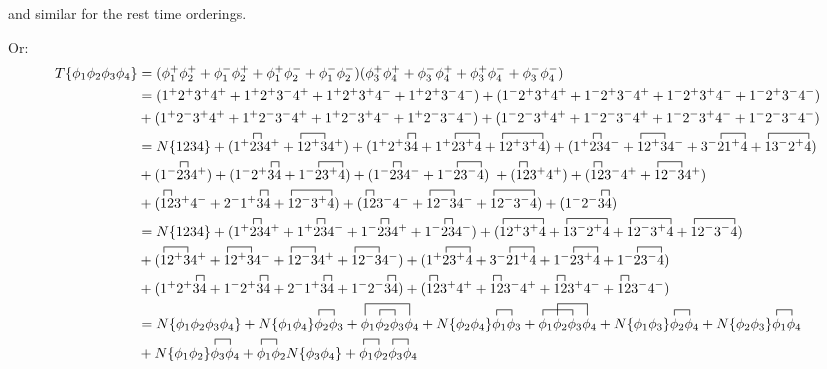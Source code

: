 \documentclass{article}
\newcommand{\N}[1]{N\Bqty{#1}}
\newcommand{\conphi}[2]{\contraction{}{\phi}{_1}{\phi}\phi_{#1}\phi_{#2}}
\begin{document}
and similar for the rest time orderings.

Or:
\begin{align*}
  T\Bqty{\phi_1\phi_2\phi_3\phi_4}&=(\phi_1^+\phi_2^++\phi_1^-\phi_2^++\phi_1^+\phi_2^-+\phi_1^-\phi_2^-)(\phi_3^+\phi_4^++\phi_3^-\phi_4^++\phi_3^+\phi_4^-+\phi_3^-\phi_4^-)\\
  &=(1^+2^+3^+4^++1^+2^+3^-4^++1^+2^+3^+4^-+1^+2^+3^-4^-)+(1^-2^+3^+4^++1^-2^+3^-4^++1^-2^+3^+4^-+1^-2^+3^-4^-)\\
  &+(1^+2^-3^+4^++1^+2^-3^-4^++1^+2^-3^+4^-+1^+2^-3^-4^-)+(1^-2^-3^+4^++1^-2^-3^-4^++1^-2^-3^+4^-+1^-2^-3^-4^-)\\
  &=\N{1234}+(1^+\contraction{}{2}{}{3} 234^++\contraction{}{1}{2^+}{3}12^+34^+)+(1^+2^+\contraction{}{3}{}{4} 34+1^+\contraction{}{2}{3^=}{4} 23^+4+\contraction{}{1}{2^=2^=}{4} 12^+3^+4)+(1^+\contraction{}{2}{}{3} 234^-+\contraction{}{1}{2^+}{3} 12^+34^-+3^-\contraction{}{2}{3^-}{4} 21^+4+\contraction{}{1}{2^-3^=}{4} 13^-2^+4)\\
  &+(1^-\contraction{}{2}{}{3}23 4^+)+(1^-2^+\contraction{}{3}{}{4}34+1^-\contraction{}{2}{3^+}{4} 23^+4)+(1^-\contraction{}{2}{}{3}23 4^-+1^-\contraction{}{2}{3^=}{4}2 3^-4)\;+(\contraction{}{1}{}{2}12 3^+4^+)+(\contraction{}{1}{}{2}123^-4^++\contraction{}{1}{2^=}{3} 12^-34^+)\\
  &+(\contraction{}{1}{}{2}12 3^+4^-+2^-1^+\contraction{}{3}{}{4}34+\contraction{}{1}{2^-3^+}{4}12^-3^+4)+(\contraction{}{1}{}{2}12 3^-4^-+\contraction{}{ 1}{2^-}{3}12^-34^-+\contraction{}{1}{2^-2^=}{4} 12^-3^-4)+(1^-2^-\contraction{}{3}{}{4}34)\\
  &=\N{1234}+(1^+\contraction{}{2}{}{3} 234^++1^+\contraction{}{2}{}{3} 234^-+1^-\contraction{}{2}{}{3}23 4^++1^-\contraction{}{2}{}{3}23 4^-)+(\contraction{}{1}{2^=2^=}{4} 12^+3^+4+\contraction{}{1}{2^-3^=}{4} 13^-2^+4+\contraction{}{1}{2^-3^+}{4}12^-3^+4+\contraction{}{1}{2^-2^=}{4} 12^-3^-4)\\
  &+(\contraction{}{1}{2^+}{3}12^+34^++\contraction{}{1}{2^+}{3} 12^+34^-+\contraction{}{1}{2^=}{3} 12^-34^++\contraction{}{ 1}{2^-}{3}12^-34^-)+(1^+\contraction{}{2}{3^=}{4} 23^+4+3^-\contraction{}{2}{3^-}{4} 21^+4+1^-\contraction{}{2}{3^+}{4} 23^+4+1^-\contraction{}{2}{3^=}{4}2 3^-4)\\
  &+(1^+2^+\contraction{}{3}{}{4} 34+1^-2^+\contraction{}{3}{}{4}34+2^-1^+\contraction{}{3}{}{4}34+1^-2^-\contraction{}{3}{}{4}34)+(\contraction{}{1}{}{2}12 3^+4^++\contraction{}{1}{}{2}123^-4^++\contraction{}{1}{}{2}12 3^+4^-+\contraction{}{1}{}{2}12 3^-4^-)\\
  &=\N{\phi_1\phi_2\phi_3\phi_4}+\N{\phi_1\phi_4}\conphi{2}{3}+\contraction[2ex]{}{\phi}{_1\phi_2\phi_3}{\phi}\contraction{\phi_1}{\phi}{_2}{\phi}\phi_1\phi_2\phi_3\phi_4+\N{\phi_2\phi_4}\conphi{1}{3}+\contraction{}{\phi}{_1\phi_2}{\phi}\contraction[2ex]{\phi_1}{\phi}{_2\phi_3}{\phi}\phi_1\phi_2\phi_3\phi_4+\N{\phi_1\phi_3}\conphi{2}{4}+\N{\phi_2\phi_3}\conphi{1}{4}\\
  &+\N{\phi_1\phi_2}\conphi{3}{4}+\conphi{1}{2}\N{\phi_3\phi_4}+\conphi{1}{2}\conphi{3}{4}
\end{align*}
\end{document}
